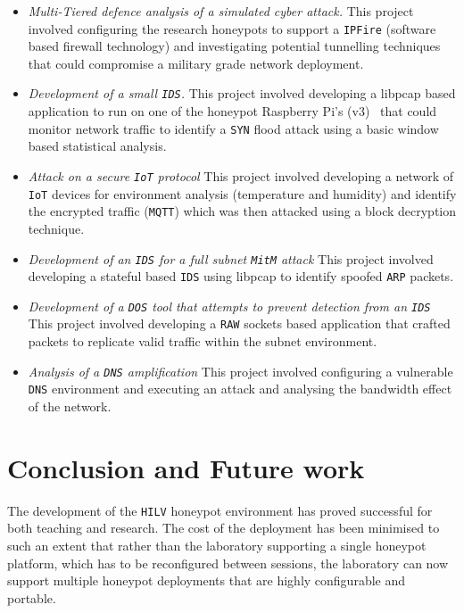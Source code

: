 \begin{itemize} 
  \item \noindent \emph{Multi-Tiered defence analysis of a simulated cyber
    attack.} This project involved configuring the research honeypots to
    support a \texttt{IPFire} (software based firewall technology) and
    investigating potential tunnelling techniques that could compromise a
    military grade network deployment.  
  \item \noindent \emph{Development of a small \texttt{IDS}.} This project
    involved developing a libpcap based application to run on one of the
    honeypot Raspberry Pi's (v3)~\cite{RASP:17} that could monitor network
    traffic to identify a \texttt{SYN} flood attack using a basic window based
    statistical analysis.  
    \item \noindent \emph{Attack on a secure \texttt{IoT} protocol} This
      project involved developing a network of \texttt{IoT} devices for
      environment analysis (temperature and humidity) and identify the
      encrypted traffic (\texttt{MQTT}) which was then attacked using a block
      decryption technique.  
    \item \noindent \emph{Development of an \texttt{IDS} for a full subnet
      \texttt{MitM} attack} This project involved developing a stateful based
      \texttt{IDS} using libpcap to identify spoofed \texttt{ARP} packets.  
    \item \noindent \emph{Development of a \texttt{DOS} tool that attempts to
      prevent detection from an \texttt{IDS}} This project involved developing
      a \texttt{RAW} sockets based application that crafted packets to
      replicate valid traffic within the subnet environment.  
     \item \noindent \emph{Analysis of a \texttt{DNS} amplification} This
       project involved configuring a vulnerable \texttt{DNS} environment and
       executing an attack and analysing the bandwidth effect of the network.
\end{itemize}

\section{Conclusion and Future work}\label{Future}

The development of the \texttt{HILV} honeypot environment has proved successful
for both teaching and research. The cost of the deployment has been minimised
to such an extent that rather than the laboratory supporting a single honeypot
platform, which has to be reconfigured between sessions, the laboratory can now
support multiple honeypot deployments that are highly configurable and
portable.

